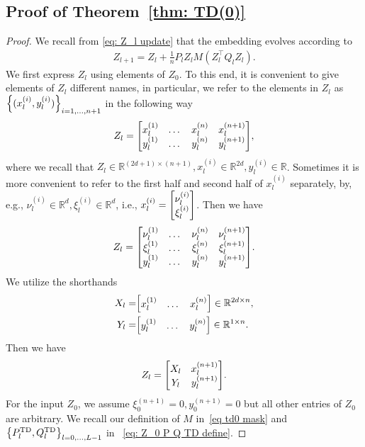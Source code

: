 \documentclass{article}
\newcommand{\R}{\mathbb{R}}
\newcommand{\td}{\text{TD}}
\begin{document}
\subsection{Proof of Theorem~\ref{thm: TD(0)}}
\label{sec proof of thm TD(0)}
\begin{proof}
    We recall from \eqref{eq: Z_l update} that the embedding evolves according to
    \begin{align}
        Z_{l+1} = Z_l + \frac{1}{n} P_l Z_l M(Z_l^\top Q_l Z_l).
    \end{align}
    We first express $Z_l$ using elements of $Z_0$.
    To this end,
    it is convenient to give elements of $Z_l$ different names,
    in particular,
    we refer to the elements in $Z_l$ as $\qty{(x^{(i)}_l, y^{(i)}_l)}_{i=1,\dots, n+1}$ in the following way
    \begin{align}
        Z_l = \mqty[x_l^{(1)} & \dots & x_l^{(n)} & x_l^{(n+1)} \\ y_l^{(1)} & \dots & y_l^{(n)} & y_l^{(n+1)}],
    \end{align}
    where we recall that $Z_l \in \R^{(2d + 1) \times (n+1)}, x_l^{(i)} \in \R^{2d}, y^{(i)}_l \in \R$.
    Sometimes it is more convenient to refer to the first half and second half of $x_l^{(i)}$ separately,
    by, e.g., $\nu^{(i)}_l \in \R^d, \xi_l^{(i)} \in \R^d$, i.e., $x_l^{(i)} = \mqty[\nu_l^{(i)} \\ \xi_l^{(i)}]$.
    Then we have
    \begin{align}
        Z_l = \mqty[\nu_l^{(1)} & \dots & \nu_l^{(n)} & \nu_l^{(n+1)} \\
        \xi_l^{(1)} & \dots & \xi_l^{(n)} & \xi_l^{(n+1)} \\
         y_l^{(1)} & \dots & y_l^{(n)} & y_l^{(n+1)}].
    \end{align}
    We utilize the shorthands
    \begin{align}
        X_l =& \mqty[x_l^{(1)} & \dots & x_l^{(n)}] \in \R^{2d \times n}, \\
        Y_l =&  \mqty[y_l^{(1)} & \dots & y_l^{(n)}] \in \R^{1 \times n}.
    \end{align}
    Then we have
    \begin{align}
        Z_l = \mqty[X_l & x_l^{(n+1)} \\ Y_l & y_l^{(n+1)}]. \label{eq: z_l blockwise X Y}
    \end{align}
    For the input $Z_0$,
    we assume $\xi_0^{(n+1)} = 0, y_0^{(n+1)} = 0$ but all other entries of $Z_0$ are arbitrary.
    We recall our definition of $M$ in~\eqref{eq td0 mask} and $\qty{P_l^\td, Q_l^\td}_{l=0,\dots,L-1}$ in ~\eqref{eq: Z_0 P Q TD define}.

\end{proof}
\end{document}
